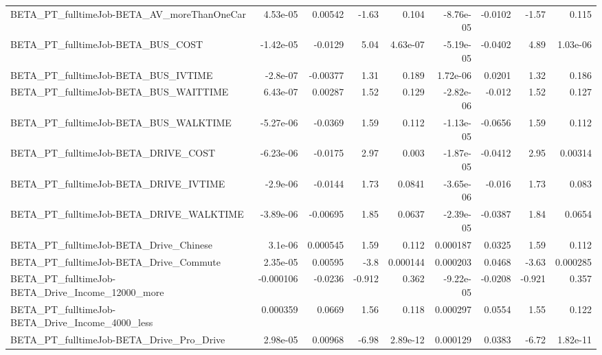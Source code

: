\begin{tabular}{lrrrrrrrr}
BETA\_PT\_fulltimeJob-BETA\_AV\_moreThanOneCar         &    4.53e-05 &      0.00542 &     -1.63 &    0.104 &  -8.76e-05 &     -0.0102 &        -1.57 &         0.115 \\
BETA\_PT\_fulltimeJob-BETA\_BUS\_COST                  &   -1.42e-05 &      -0.0129 &      5.04 & 4.63e-07 &  -5.19e-05 &     -0.0402 &         4.89 &      1.03e-06 \\
BETA\_PT\_fulltimeJob-BETA\_BUS\_IVTIME                &    -2.8e-07 &     -0.00377 &      1.31 &    0.189 &   1.72e-06 &      0.0201 &         1.32 &         0.186 \\
BETA\_PT\_fulltimeJob-BETA\_BUS\_WAITTIME              &    6.43e-07 &      0.00287 &      1.52 &    0.129 &  -2.82e-06 &      -0.012 &         1.52 &         0.127 \\
BETA\_PT\_fulltimeJob-BETA\_BUS\_WALKTIME              &   -5.27e-06 &      -0.0369 &      1.59 &    0.112 &  -1.13e-05 &     -0.0656 &         1.59 &         0.112 \\
BETA\_PT\_fulltimeJob-BETA\_DRIVE\_COST                &   -6.23e-06 &      -0.0175 &      2.97 &    0.003 &  -1.87e-05 &     -0.0412 &         2.95 &       0.00314 \\
BETA\_PT\_fulltimeJob-BETA\_DRIVE\_IVTIME              &    -2.9e-06 &      -0.0144 &      1.73 &   0.0841 &  -3.65e-06 &      -0.016 &         1.73 &         0.083 \\
BETA\_PT\_fulltimeJob-BETA\_DRIVE\_WALKTIME            &   -3.89e-06 &     -0.00695 &      1.85 &   0.0637 &  -2.39e-05 &     -0.0387 &         1.84 &        0.0654 \\
BETA\_PT\_fulltimeJob-BETA\_Drive\_Chinese             &     3.1e-06 &     0.000545 &      1.59 &    0.112 &   0.000187 &      0.0325 &         1.59 &         0.112 \\
BETA\_PT\_fulltimeJob-BETA\_Drive\_Commute             &    2.35e-05 &      0.00595 &      -3.8 & 0.000144 &   0.000203 &      0.0468 &        -3.63 &      0.000285 \\
BETA\_PT\_fulltimeJob-BETA\_Drive\_Income\_12000\_more   &   -0.000106 &      -0.0236 &    -0.912 &    0.362 &  -9.22e-05 &     -0.0208 &       -0.921 &         0.357 \\
BETA\_PT\_fulltimeJob-BETA\_Drive\_Income\_4000\_less    &    0.000359 &       0.0669 &      1.56 &    0.118 &   0.000297 &      0.0554 &         1.55 &         0.122 \\
BETA\_PT\_fulltimeJob-BETA\_Drive\_Pro\_Drive           &    2.98e-05 &      0.00968 &     -6.98 & 2.89e-12 &   0.000129 &      0.0383 &        -6.72 &      1.82e-11 \\

\end{tabular}
